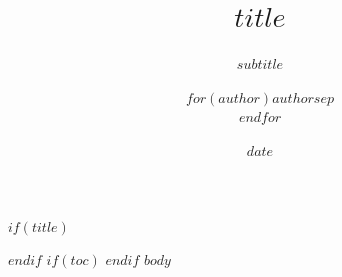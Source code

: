 \documentclass[11pt,letterpaper]{article}
\title{$title$}
\subtitle{$subtitle$}
\author{$for(author)$$author$$sep$ \\ $endfor$}
\date{$date$}
\begin{document}
$if(title)$
\maketitle
$endif$
$if(toc)$
\tableofcontents
\newpage
$endif$
$body$
\end{document}
